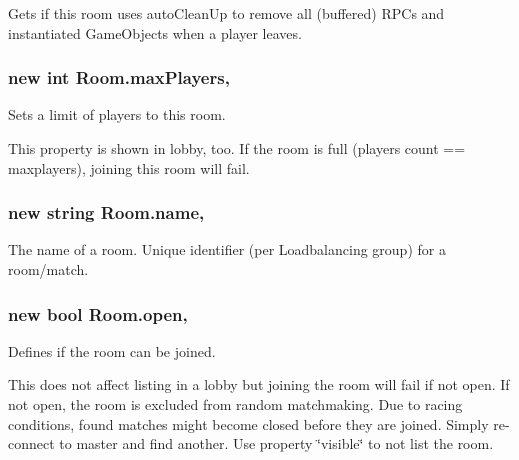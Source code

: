 Gets if this room uses auto\+Clean\+Up to remove all (buffered) R\+P\+Cs and instantiated Game\+Objects when a player leaves. 

\subsubsection[{\texorpdfstring{max\+Players}{maxPlayers}}]{\setlength{\rightskip}{0pt plus 5cm}new int Room.\+max\+Players\hspace{0.3cm}{\ttfamily [get]}, {\ttfamily [set]}}\hypertarget{class_room_a3d3329a383d9cc0e4dcf10527ed42845}{}\label{class_room_a3d3329a383d9cc0e4dcf10527ed42845}


Sets a limit of players to this room. 

This property is shown in lobby, too. If the room is full (players count == maxplayers), joining this room will fail. 
\subsubsection[{\texorpdfstring{name}{name}}]{\setlength{\rightskip}{0pt plus 5cm}new string Room.\+name\hspace{0.3cm}{\ttfamily [get]}, {\ttfamily [set]}}\hypertarget{class_room_ad9eb0946b646b789772238b429d6266c}{}\label{class_room_ad9eb0946b646b789772238b429d6266c}


The name of a room. Unique identifier (per Loadbalancing group) for a room/match.

\subsubsection[{\texorpdfstring{open}{open}}]{\setlength{\rightskip}{0pt plus 5cm}new bool Room.\+open\hspace{0.3cm}{\ttfamily [get]}, {\ttfamily [set]}}\hypertarget{class_room_a86a1e0952d484cc7a679e141463f43c1}{}\label{class_room_a86a1e0952d484cc7a679e141463f43c1}


Defines if the room can be joined. 

This does not affect listing in a lobby but joining the room will fail if not open. If not open, the room is excluded from random matchmaking. Due to racing conditions, found matches might become closed before they are joined. Simply re-\/connect to master and find another. Use property \char`\"{}visible\char`\"{} to not list the room. 

